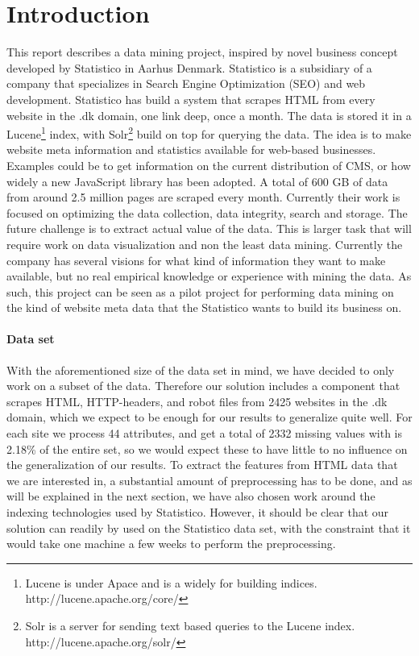 \section{Introduction}
\label{sec:introduction}

This report describes a data mining project, inspired by novel business concept developed by Statistico in Aarhus Denmark. Statistico is a subsidiary of a company that specializes in Search Engine Optimization (SEO) and web development. Statistico has build a system that scrapes HTML from every website in the .dk domain, one link deep, once a month. The data is stored it in a Lucene\footnote{Lucene is under Apace and is a widely for building indices. http://lucene.apache.org/core/} index, with Solr\footnote{Solr is a server for sending text based queries to the Lucene index. http://lucene.apache.org/solr/} build on top for querying the data. The idea is to make website meta information and statistics available for web-based businesses. Examples could be to get information on the current distribution of CMS, or how widely a new JavaScript library has been adopted. A total of 600 GB of data from around 2.5 million pages are scraped every month. Currently their work is focused on optimizing the data collection, data integrity, search and storage.
The future challenge is to extract actual value of the data. This is larger task that will require work on data visualization and non the least data mining. Currently the company has several visions for what kind of information they want to make available, but no real empirical knowledge or experience with mining the data. As such, this project can be seen as a pilot project for performing data mining on the kind of website meta data that the Statistico wants to build its business on.

\paragraph{Data set}
\label{subsec:data_set}
With the aforementioned size of the data set in mind, we have decided to only work on a subset of the data. Therefore our solution includes a component that scrapes HTML, HTTP-headers, and robot files from 2425 websites in the .dk domain, which we expect to be enough for our results to generalize quite well. For each site we process 44 attributes, and get a total of 2332 missing values with is 2.18\% of the entire set, so we would expect these to have little to no influence on the generalization of our results. To extract the features from HTML data that we are interested in, a substantial amount of preprocessing has to be done, and as will be explained in the next section, we have also chosen work around the indexing technologies used by Statistico. However, it should be clear that our solution can readily by used on the Statistico data set, with the constraint that it would take one machine a few weeks to perform the preprocessing.

